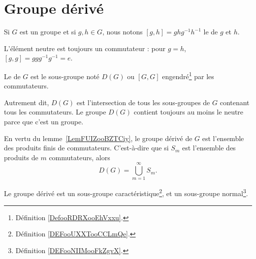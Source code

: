 \section{Groupe dérivé}

\begin{definition}      \label{DEFooVHZAooUgmesE}
	Si \( G\) est un groupe et si \( g,h\in G\), nous notons \( [g,h]=ghg^{-1}h^{-1}\) le  de \( g\) et \( h\).
\end{definition}

L'élément neutre est toujours un commutateur : pour \( g=h \), \( [g,g]=ggg^{-1}g^{-1}=e \).

\begin{definition}      \label{DEFooBNLPooShKYXa}
	Le  de \( G\) est le sous-groupe noté \( D(G)\) ou \( [G,G]\) engendré\footnote{Définition \ref{DefooRDRXooEhVxxu}.} par les commutateurs.
\end{definition}
Autrement dit, \( D(G)\) est l'intersection de tous les sous-groupes de \( G\) contenant tous les commutateurs. Le groupe \( D(G)\) contient toujours au moins le neutre parce que c'est un groupe.

En vertu du lemme~\ref{LemFUIZooBZTCiy}, le groupe dérivé de \( G\) est l'ensemble des produits finis de commutateurs. C'est-à-dire que si \( S_m\) est l'ensemble des produits de \( m\) commutateurs, alors
\begin{equation}
	D(G)=\bigcup_{m=1}^{\infty}S_m.
\end{equation}

\begin{lemma}   \label{LemMMOCooDJJJhy}
	Le groupe dérivé est un sous-groupe caractéristique\footnote{Définition \ref{DEFooUXXTooCCLmQe}.}, et un sous-groupe normal\footnote{Définition \ref{DEFooNIIMooFkZgvX}.}.
\end{lemma}


